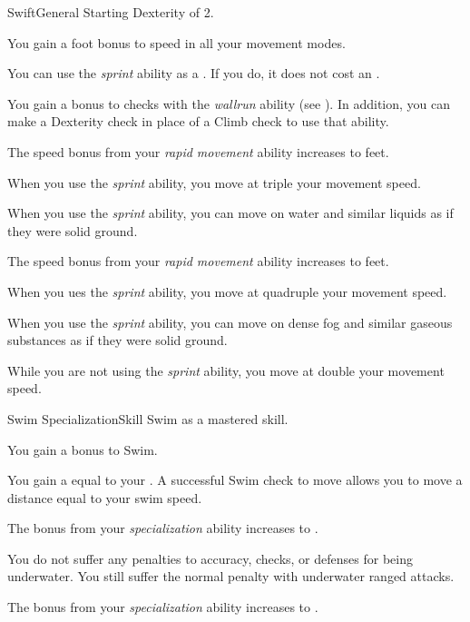     \begin{feat}{Swift}{General}
        \featpre Starting Dexterity of 2.

         You gain a  foot bonus to speed in all your movement modes.

         You can use the \textit{sprint} ability as a .
        If you do, it does not cost an .

         You gain a  bonus to checks with the \textit{wallrun} ability (see ).
        In addition, you can make a Dexterity check in place of a Climb check to use that ability.

         The speed bonus from your \textit{rapid movement} ability increases to  feet.

         When you use the \textit{sprint} ability, you move at triple your movement speed.

         When you use the \textit{sprint} ability, you can move on water and similar liquids as if they were solid ground.

         The speed bonus from your \textit{rapid movement} ability increases to  feet.

         When you ues the \textit{sprint} ability, you move at quadruple your movement speed.

         When you use the \textit{sprint} ability, you can move on dense fog and similar gaseous substances as if they were solid ground.

         While you are not using the \textit{sprint} ability, you move at double your movement speed.
    \end{feat}

    \begin{feat}{Swim Specialization}{Skill}
        \featpre Swim as a mastered skill.

        \ff{}

         You gain a  bonus to Swim.

         You gain a  equal to your .
        A successful Swim check to move allows you to move a distance equal to your swim speed.

         The bonus from your \textit{specialization} ability increases to .

         You do not suffer any penalties to accuracy, checks, or defenses for being underwater.
        You still suffer the normal penalty with underwater ranged attacks.

         The bonus from your \textit{specialization} ability increases to .
    \end{feat}

